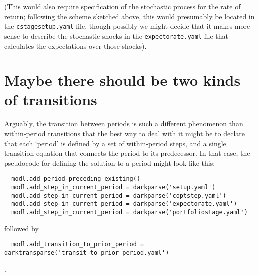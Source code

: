 \documentclass[SolvingMicroDSOPs]{subfiles}
\begin{document}
(This would also require specification of the stochastic process for the rate of return; following the scheme sketched above, this would presumably be located in the \texttt{cstagesetup.yaml} file, though possibly we might decide that it makes more sense to describe the stochastic shocks in the \texttt{expectorate.yaml} file that calculates the expectations over those shocks).

\section{Maybe there should be two kinds of transitions}

Arguably, the transition between periods is such a different phenomenon than within-period transitions that the best way to deal with it might be to declare that each `period' is defined by a set of within-period steps, and a single transition equation that connects the period to its predecessor.  In that case, the pseudocode for defining the solution to a period might look like this:

\begin{verbatim}
  modl.add_period_preceding_existing()
  modl.add_step_in_current_period = darkparse('setup.yaml')
  modl.add_step_in_current_period = darkparse('coptstep.yaml')
  modl.add_step_in_current_period = darkparse('expectorate.yaml')
  modl.add_step_in_current_period = darkparse('portfoliostage.yaml')
\end{verbatim}
followed by
\begin{verbatim}
  modl.add_transition_to_prior_period = darktransparse('transit_to_prior_period.yaml')
\end{verbatim}
.




\onlyinsubfile{}
\end{document}
